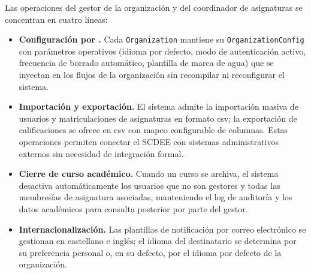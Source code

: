 Las operaciones del gestor de la organización y del coordinador de
asignaturas se concentran en cuatro líneas:

\begin{itemize}

  \item \textbf{Configuración por .} Cada
  \texttt{Organization} mantiene su \texttt{OrganizationConfig} con
  parámetros operativos (idioma por defecto, modo de autenticación
  activo, frecuencia de borrado automático, plantilla de marca de
  agua) que se inyectan en los flujos de la organización sin
  recompilar ni reconfigurar el sistema.

  \item \textbf{Importación y exportación.} El sistema admite la
  importación masiva de usuarios y matriculaciones de asignaturas en
  formato \acs{csv}; la exportación de calificaciones se ofrece en
  \acs{csv} con mapeo configurable de columnas. Estas operaciones
  permiten conectar el SCDEE con sistemas administrativos externos
  sin necesidad de integración formal.

  \item \textbf{Cierre de curso académico.} Cuando un curso se
  archiva, el sistema desactiva automáticamente los usuarios que no
  son gestores y todas las membresías de asignatura asociadas,
  manteniendo el log de auditoría y los datos académicos para
  consulta posterior por parte del gestor.

  \item \textbf{Internacionalización.} Las plantillas de notificación
  por correo electrónico se gestionan en castellano e inglés; el idioma
  del destinatario se determina por su preferencia personal o, en su
  defecto, por el idioma por defecto de la organización.

\end{itemize}
